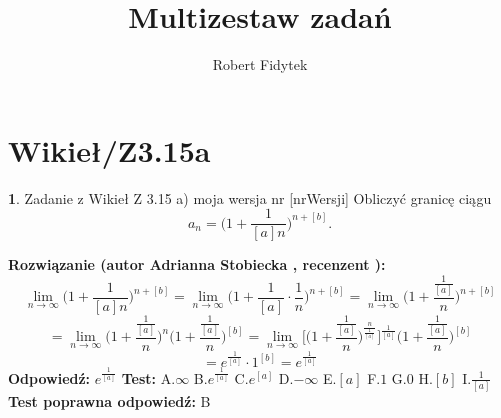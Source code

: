 \documentclass[12pt, a4paper]{article}
\title{Multizestaw zadań}
\author{Robert Fidytek}
\date{}
\theoremstyle{definition} %
\newtheorem{zad}{}
\newcommand{\kategoria}[1]{\section{#1}} %
\newcommand{\zadStart}[1]{\begin{zad}#1\newline} %
\newcommand{\zadStop}{\end{zad}}   %
\newcommand{\rozwStart}[2]{\noindent \textbf{Rozwiązanie (autor #1 , recenzent #2): }\newline} %
\newcommand{\rozwStop}{\newline}                                            %
\newcommand{\odpStart}{\noindent \textbf{Odpowiedź:}\newline}    %
\newcommand{\odpStop}{\newline}                                             %
\newcommand{\testStart}{\noindent \textbf{Test:}\newline} %
\newcommand{\testStop}{\newline} %
\newcommand{\kluczStart}{\noindent \textbf{Test poprawna odpowiedź:}\newline} %
\newcommand{\kluczStop}{\newline} %
\begin{document}
\maketitle


\kategoria{Wikieł/Z3.15a}
\zadStart{Zadanie z Wikieł Z 3.15 a) moja wersja nr [nrWersji]}
Obliczyć granicę ciągu 
$$a_n=\bigg(1+\frac{1}{[a]n}\bigg)^{n+[b]}.$$
\zadStop
\rozwStart{Adrianna Stobiecka}{}
$$\lim_{n\to\infty}\bigg(1+\frac{1}{[a]n}\bigg)^{n+[b]}=\lim_{n\to\infty}\bigg(1+\frac{1}{[a]}\cdot\frac{1}{n}\bigg)^{n+[b]}=\lim_{n\to\infty}\bigg(1+\frac{\frac{1}{[a]}}{n}\bigg)^{n+[b]}$$
$$=\lim_{n\to\infty}\bigg(1+\frac{\frac{1}{[a]}}{n}\bigg)^{n}\bigg(1+\frac{\frac{1}{[a]}}{n}\bigg)^{[b]}=\lim_{n\to\infty}\bigg[\bigg(1+\frac{\frac{1}{[a]}}{n}\bigg)^{\frac{n}{\frac{1}{[a]}}}\bigg]^{\frac{1}{[a]}}\bigg(1+\frac{\frac{1}{[a]}}{n}\bigg)^{[b]}$$
$$=e^{\frac{1}{[a]}}\cdot1^{[b]}=e^{\frac{1}{[a]}}$$
\rozwStop
\odpStart
$e^{\frac{1}{[a]}}$
\odpStop
\testStart
A.$\infty$
B.$e^{\frac{1}{[a]}}$
C.$e^{[a]}$
D.$-\infty$
E.$[a]$
F.$1$
G.$0$
H.$[b]$
I.$\frac{1}{[a]}$
\testStop
\kluczStart
B
\kluczStop
\end{document}
